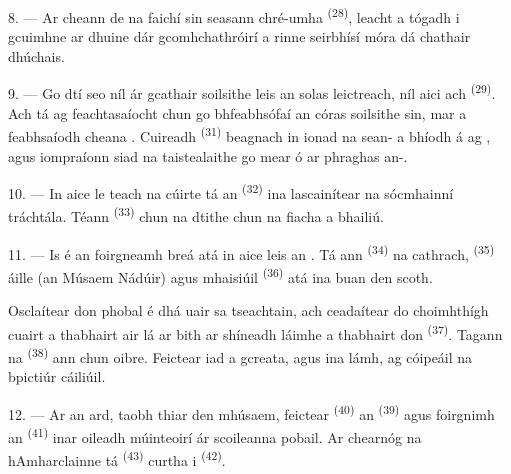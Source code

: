 8. --- Ar cheann de na faichí sin seasann  chré-umha
\textsuperscript{(28)}, leacht a tógadh i gcuimhne ar dhuine dár gcomhchathróirí a
rinne seirbhísí móra dá chathair dhúchais.

\VUsaut{4.0mm}
\VUsaut{3.4mm}

9. --- Go dtí seo níl ár gcathair soilsithe leis an solas leictreach, níl aici ach
 \textsuperscript{(29)}. Ach tá  ag
feachtasaíocht chun go bhfeabhsófaí an córas soilsithe sin,  mar a
feabhsaíodh cheana . Cuireadh
 \textsuperscript{(31)} beagnach in ionad na
sean- a bhíodh á  ag , agus
iompraíonn siad na taistealaithe go mear ó  ar phraghas an-.

10. --- In aice le teach na cúirte tá an  \textsuperscript{(32)} ina
lascainítear na sócmhainní tráchtála. Téann 
\textsuperscript{(33)} chun na dtithe chun na fiacha a bhailiú.

\VUsaut{4.0mm}
\VUsaut{3.4mm}

11. --- Is é an foirgneamh breá atá in aice leis an . Tá ann
 \textsuperscript{(34)} na cathrach,  \textsuperscript{(35)} áille (an Músaem Nádúir) agus 
mhaisiúil \textsuperscript{(36)} atá ina  buan den scoth.

Osclaítear don phobal é dhá uair sa tseachtain, ach ceadaítear do choimhthígh cuairt a
thabhairt air lá ar bith ar shíneadh láimhe a thabhairt don 
\textsuperscript{(37)}. Tagann na  \textsuperscript{(38)} ann chun
oibre. Feictear iad  a gcreata, agus  ina lámh, ag
cóipeáil na bpictiúr cáiliúil.

12. --- Ar an ard, taobh thiar den mhúsaem, feictear 
\textsuperscript{(40)} an  \textsuperscript{(39)} agus foirgnimh an
 \textsuperscript{(41)} inar oileadh múinteoirí ár
scoileanna pobail. Ar chearnóg na hAmharclainne tá 
\textsuperscript{(43)} curtha i  \textsuperscript{(42)}.

